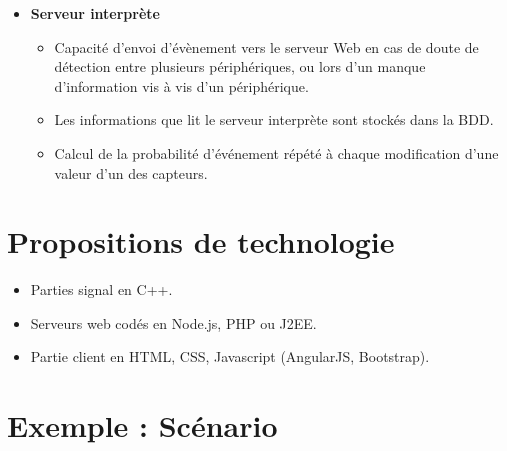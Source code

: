 \documentclass[10pt,a4paper]{article}
\begin{document}
\begin{itemize}
\item \textbf{Serveur interprète}
\begin{itemize}
  \item Capacité d'envoi d'évènement vers le serveur Web en cas de doute de détection entre plusieurs périphériques, ou lors d'un manque d'information vis à vis d'un périphérique.
  \item Les informations que lit le serveur interprète sont stockés dans la BDD.
  \item Calcul de la probabilité d'événement répété à chaque modification d'une valeur d'un des capteurs.
\end{itemize}
\end{itemize}

\section{Propositions de technologie}
\begin{itemize}
\item Parties signal en C++.
\item Serveurs web codés en Node.js, PHP ou J2EE.
\item Partie client en HTML, CSS, Javascript (AngularJS, Bootstrap).
\end{itemize}

\newpage
\section{Exemple : Scénario}
\end{document}
